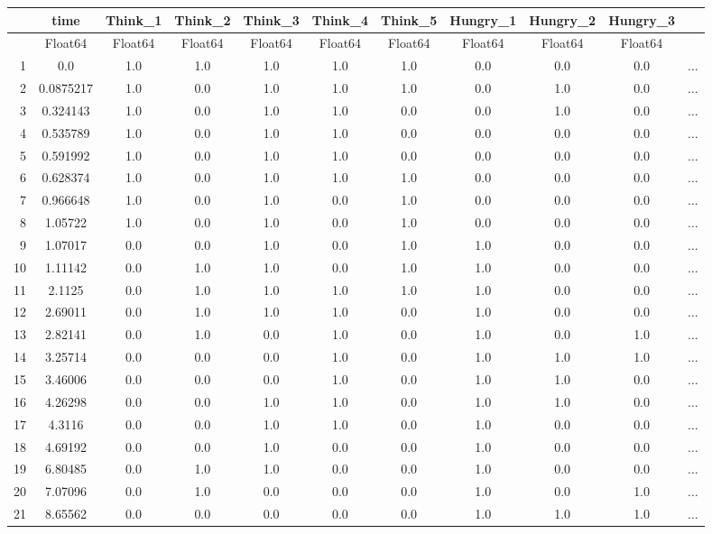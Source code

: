 \documentclass[
  12pt,
  a4paper,
  DIV=11,
  numbers=noendperiod]{scrreprt}
\begin{document}
\begin{tabular}{r|cccccccccc}
    & time & Think\_1 & Think\_2 & Think\_3 & Think\_4 & Think\_5 & Hungry\_1 & Hungry\_2 & Hungry\_3 & \\
    \hline
    & Float64 & Float64 & Float64 & Float64 & Float64 & Float64 & Float64 & Float64 & Float64 & \\
    \hline
    1 & 0.0 & 1.0 & 1.0 & 1.0 & 1.0 & 1.0 & 0.0 & 0.0 & 0.0 & $\dots$ \\
    2 & 0.0875217 & 1.0 & 0.0 & 1.0 & 1.0 & 1.0 & 0.0 & 1.0 & 0.0 & $\dots$ \\
    3 & 0.324143 & 1.0 & 0.0 & 1.0 & 1.0 & 0.0 & 0.0 & 1.0 & 0.0 & $\dots$ \\
    4 & 0.535789 & 1.0 & 0.0 & 1.0 & 1.0 & 0.0 & 0.0 & 0.0 & 0.0 & $\dots$ \\
    5 & 0.591992 & 1.0 & 0.0 & 1.0 & 1.0 & 0.0 & 0.0 & 0.0 & 0.0 & $\dots$ \\
    6 & 0.628374 & 1.0 & 0.0 & 1.0 & 1.0 & 1.0 & 0.0 & 0.0 & 0.0 & $\dots$ \\
    7 & 0.966648 & 1.0 & 0.0 & 1.0 & 0.0 & 1.0 & 0.0 & 0.0 & 0.0 & $\dots$ \\
    8 & 1.05722 & 1.0 & 0.0 & 1.0 & 0.0 & 1.0 & 0.0 & 0.0 & 0.0 & $\dots$ \\
    9 & 1.07017 & 0.0 & 0.0 & 1.0 & 0.0 & 1.0 & 1.0 & 0.0 & 0.0 & $\dots$ \\
    10 & 1.11142 & 0.0 & 1.0 & 1.0 & 0.0 & 1.0 & 1.0 & 0.0 & 0.0 & $\dots$ \\
    11 & 2.1125 & 0.0 & 1.0 & 1.0 & 1.0 & 1.0 & 1.0 & 0.0 & 0.0 & $\dots$ \\
    12 & 2.69011 & 0.0 & 1.0 & 1.0 & 1.0 & 0.0 & 1.0 & 0.0 & 0.0 & $\dots$ \\
    13 & 2.82141 & 0.0 & 1.0 & 0.0 & 1.0 & 0.0 & 1.0 & 0.0 & 1.0 & $\dots$ \\
    14 & 3.25714 & 0.0 & 0.0 & 0.0 & 1.0 & 0.0 & 1.0 & 1.0 & 1.0 & $\dots$ \\
    15 & 3.46006 & 0.0 & 0.0 & 0.0 & 1.0 & 0.0 & 1.0 & 1.0 & 0.0 & $\dots$ \\
    16 & 4.26298 & 0.0 & 0.0 & 1.0 & 1.0 & 0.0 & 1.0 & 1.0 & 0.0 & $\dots$ \\
    17 & 4.3116 & 0.0 & 0.0 & 1.0 & 1.0 & 0.0 & 1.0 & 0.0 & 0.0 & $\dots$ \\
    18 & 4.69192 & 0.0 & 0.0 & 1.0 & 0.0 & 0.0 & 1.0 & 0.0 & 0.0 & $\dots$ \\
    19 & 6.80485 & 0.0 & 1.0 & 1.0 & 0.0 & 0.0 & 1.0 & 0.0 & 0.0 & $\dots$ \\
    20 & 7.07096 & 0.0 & 1.0 & 0.0 & 0.0 & 0.0 & 1.0 & 0.0 & 1.0 & $\dots$ \\
    21 & 8.65562 & 0.0 & 0.0 & 0.0 & 0.0 & 0.0 & 1.0 & 1.0 & 1.0 & $\dots$ \\
\end{tabular}
\end{document}
